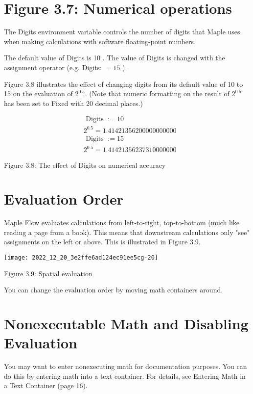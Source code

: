\section{Figure 3.7: Numerical operations}
The Digits environment variable controls the number of digits that Maple uses when making calculations with software floating-point numbers.

The default value of Digits is 10 . The value of Digits is changed with the assignment operator (e.g. Digits: $=15$ ).

Figure 3.8 illustrates the effect of changing digits from its default value of 10 to 15 on the evaluation of $2^{0.5}$. (Note that numeric formatting on the result of $2^{0.5}$ has been set to Fixed with 20 decimal places.)

\begin{equation*}
\begin{aligned}
& \text { Digits }:=10 \\
& 2^{0.5}=1.41421356200000000000 \\
& \text { Digits }:=15 \\
& 2^{0.5}=1.41421356237310000000
\end{aligned}
\end{equation*}

Figure 3.8: The effect of Digits on numerical accuracy

\section{Evaluation Order}
Maple Flow evaluates calculations from left-to-right, top-to-bottom (much like reading a page from a book). This means that downstream calculations only "see" assignments on the left or above. This is illustrated in Figure 3.9.

\begin{center}
\texttt{[image: 2022\_12\_20\_3e2ffe6ad124ec91ee5cg-20]}
\end{center}

Figure 3.9: Spatial evaluation

You can change the evaluation order by moving math containers around.

\section{Nonexecutable Math and Disabling Evaluation}
You may want to enter nonexecuting math for documentation purposes. You can do this by entering math into a text container. For details, see Entering Math in a Text Container (page 16).

